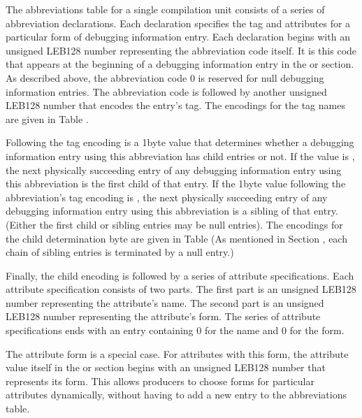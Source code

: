 The abbreviations table for a single compilation unit consists
of a series of abbreviation declarations. Each declaration
specifies the tag and attributes for a particular form of
debugging information entry. Each declaration begins with
an unsigned LEB128 number representing the abbreviation
code itself. It is this code that appears at the beginning
of a debugging information entry in the 
 or
section. As described above, the abbreviation
code 0 is reserved for null debugging information entries. The
abbreviation code is followed by another unsigned LEB128
number that encodes the entry’s tag. The encodings for the
tag names are given in 
Table .

Following the tag encoding is a 1\dash byte value that determines
whether a debugging information entry using this abbreviation
has child entries or not. If the value is 
,
the next physically succeeding entry of any debugging
information entry using this abbreviation is the first
child of that entry. If the 1\dash byte value following the
abbreviation’s tag encoding is 
, the next
physically succeeding entry of any debugging information entry
using this abbreviation is a sibling of that entry. (Either
the first child or sibling entries may be null entries). The
encodings for the child determination byte are given in 
Table 
(As mentioned in 
Section , 
each chain of
sibling entries is terminated by a null entry.)

Finally, the child encoding is followed by a series of
attribute specifications. Each attribute specification
consists of two parts. The first part is an unsigned LEB128
number representing the attribute’s name. The second part
is an unsigned LEB128 number representing the attribute’s
form. The series of attribute specifications ends with an
entry containing 0 for the name and 0 for the form.

The attribute form 
 is a special case. For
attributes with this form, the attribute value itself in the
 or 
section begins with an unsigned
LEB128 number that represents its form. This allows producers
to choose forms for particular attributes 
dynamically,
without having to add a new entry to the abbreviations table.

